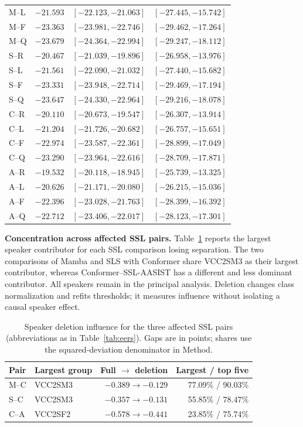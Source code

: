 \documentclass{article}
\renewcommand{\small}{\fontsize{9.1pt}{10.5pt}\selectfont}
\begin{document}
\begin{table}[t]
\begin{tabular}{@{}lrcc@{}}
M--L & $-21.593$ & $[-22.123,-21.063]$ & $[-27.445,-15.742]$ \\
M--F & $-23.363$ & $[-23.981,-22.746]$ & $[-29.462,-17.264]$ \\
M--Q & $-23.679$ & $[-24.364,-22.994]$ & $[-29.247,-18.112]$ \\
S--R & $-20.467$ & $[-21.039,-19.896]$ & $[-26.958,-13.976]$ \\
S--L & $-21.561$ & $[-22.090,-21.032]$ & $[-27.440,-15.682]$ \\
S--F & $-23.331$ & $[-23.948,-22.714]$ & $[-29.469,-17.194]$ \\
S--Q & $-23.647$ & $[-24.330,-22.964]$ & $[-29.216,-18.078]$ \\
C--R & $-20.110$ & $[-20.673,-19.547]$ & $[-26.307,-13.914]$ \\
C--L & $-21.204$ & $[-21.726,-20.682]$ & $[-26.757,-15.651]$ \\
C--F & $-22.974$ & $[-23.587,-22.361]$ & $[-28.899,-17.049]$ \\
C--Q & $-23.290$ & $[-23.964,-22.616]$ & $[-28.709,-17.871]$ \\
A--R & $-19.532$ & $[-20.118,-18.945]$ & $[-25.739,-13.325]$ \\
A--L & $-20.626$ & $[-21.171,-20.080]$ & $[-26.215,-15.036]$ \\
A--F & $-22.396$ & $[-23.028,-21.763]$ & $[-28.399,-16.392]$ \\
A--Q & $-22.712$ & $[-23.406,-22.017]$ & $[-28.123,-17.301]$ \\
\bottomrule
\end{tabular}
\end{table}

\textbf{Concentration across affected SSL pairs.} Table~\ref{tab:influence} reports the largest speaker contributor for each SSL comparison losing separation. The two comparisons of Mamba and SLS with Conformer share VCC2SM3 as their largest contributor, whereas Conformer--SSL-AASIST has a different and less dominant contributor. All speakers remain in the principal analysis. Deletion changes class normalization and refits thresholds; it measures influence without isolating a causal speaker effect.

\begin{table}[t]
\caption{Speaker deletion influence for the three affected SSL pairs (abbreviations as in Table~\ref{tab:eers}). Gaps are in points; shares use the squared-deviation denominator in Method.}
\label{tab:influence}
\centering\small
\setlength{\tabcolsep}{3pt}
\begin{tabular}{@{}llrr@{}}
\toprule
Pair & Largest group & Full $\to$ deletion & Largest / top five \\
\midrule
M--C & VCC2SM3 & $-0.389\to-0.129$ & 77.09\% / 90.03\% \\
S--C & VCC2SM3 & $-0.357\to-0.131$ & 55.85\% / 78.47\% \\
C--A & VCC2SF2 & $-0.578\to-0.441$ & 23.85\% / 75.74\% \\
\bottomrule
\end{tabular}
\end{table}
\end{document}
